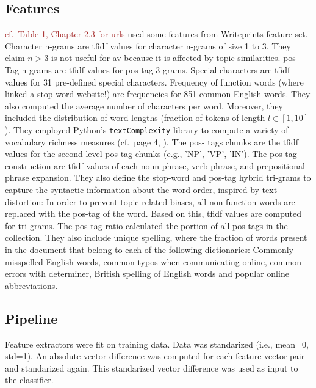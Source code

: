 \subsection{Features}
\textcolor{brown}{cf.~Table 1, \citep{weerasinghe_feature_vector_difference_2021} Chapter 2.3 for urls}
\citet{weerasinghe_feature_vector_difference_2021} used some features from Writeprints feature set.
Character n-grams are \ac{tfidf} values for character n-grams of size 1 to 3.
They claim $n>3$ is not useful for \ac{av} because it is affected by topic similarities.
\ac{pos}-Tag n-grams are \ac{tfidf} values for \ac{pos}-tag 3-grams.
Special characters are \ac{tfidf} values for 31 pre-defined special characters.
Frequency of function words (where \citep{weerasinghe_feature_vector_difference_2021} linked a stop word website!) 
are frequencies for 851 common English words.
They also computed the average number of characters per word. %
Moreover, they included the distribution of word-lengths (fraction of tokens of length $l \in [1,10]$).
They employed Python's \texttt{textComplexity} library to compute a variety of vocabulary richness measures 
(cf.~page 4, \citep{weerasinghe_feature_vector_difference_2021}).
The \ac{pos}- tags chunks are the \ac{tfidf} values for the second level \ac{pos}-tag chunks (e.g., 'NP', 'VP', 'IN').
The \ac{pos}-tag construction are \ac{tfidf} values of each noun phrase, verb phrase, and prepositional phrase expansion.
They also define the stop-word and \ac{pos}-tag hybrid tri-grams to capture the syntactic information about the word order, 
inspired by text distortion:
In order to prevent topic related biases, all non-function words are replaced with the \ac{pos}-tag of the word.
Based on this, \ac{tfidf} values are computed for tri-grams.
The \ac{pos}-tag ratio calculated the portion of all \ac{pos}-tags in the  collection.
They also include unique spelling, where the fraction of words present in the document that belong to each of the following dictionaries: 
Commonly misspelled English words, common typos when communicating online, common errors with determiner, 
British spelling of English words and popular online abbreviations.

\subsection{Pipeline}
Feature extractors were fit on training data.
Data was standarized (i.e., mean=0, std=1).
An absolute vector difference was computed for each feature vector pair and standarized again.
This standarized vector difference was used as input to the classifier.



